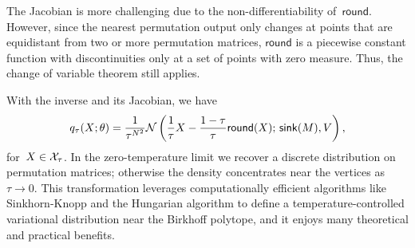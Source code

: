 \documentclass[twoside]{article}
\begin{document}

The Jacobian is more challenging due to the non-differentiability
of~$\mathsf{round}$. However, since the nearest permutation output
only changes at points that are equidistant from two or more
permutation matrices, $\mathsf{round}$ is a piecewise constant
function with discontinuities only at a set of points with
zero measure. Thus, the change of variable theorem still applies.

With the inverse and its Jacobian, we have
\begin{align*}
  q_\tau(X; \theta) = 
  \frac{1}{\tau^{N^2}} \mathcal{N} \left( \frac{1}{\tau}X -\frac{1-\tau}{\tau} \mathsf{round}(X); \, \mathsf{sink}(M), V \right),
\end{align*}
for~${X \in \mathcal{X}_\tau}$.
In the zero-temperature limit we recover a discrete
distribution on permutation matrices; otherwise the density
concentrates near the vertices as~${\tau \to 0}$.  This
transformation leverages computationally efficient algorithms
like Sinkhorn-Knopp and the Hungarian algorithm to define a
temperature-controlled variational distribution near the
Birkhoff polytope, and it enjoys many theoretical and practical
benefits.
\end{document}
